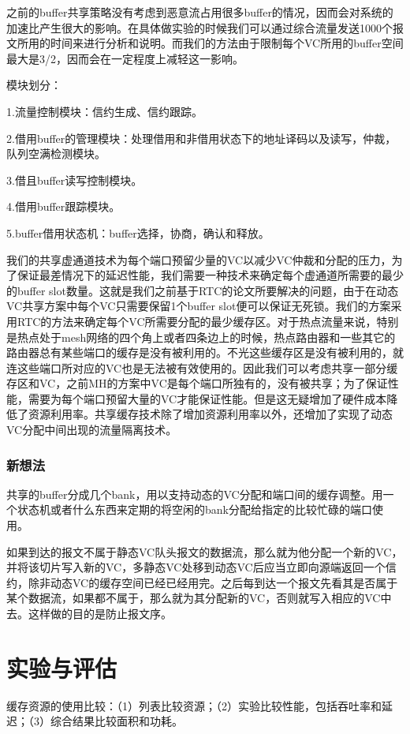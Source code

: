 ﻿\documentclass[10pt,journal]{IEEEtran}
\begin{document}
之前的buffer共享策略没有考虑到恶意流占用很多buffer的情况，因而会对系统的加速比产生很大的影响。在具体做实验的时候我们可以通过综合流量发送1000个报文所用的时间来进行分析和说明。而我们的方法由于限制每个VC所用的buffer空间最大是3/2，因而会在一定程度上减轻这一影响。

模块划分：

1.流量控制模块：信约生成、信约跟踪。

2.借用buffer的管理模块：处理借用和非借用状态下的地址译码以及读写，仲裁，队列空满检测模块。

3.借且buffer读写控制模块。

4.借用buffer跟踪模块。

5.buffer借用状态机：buffer选择，协商，确认和释放。

我们的共享虚通道技术为每个端口预留少量的VC以减少VC仲裁和分配的压力，为了保证最差情况下的延迟性能，我们需要一种技术来确定每个虚通道所需要的最少的buffer slot数量。这就是我们之前基于RTC的论文所要解决的问题，由于在动态VC共享方案中每个VC只需要保留1个buffer slot便可以保证无死锁。我们的方案采用RTC的方法来确定每个VC所需要分配的最少缓存区。对于热点流量来说，特别是热点处于mesh网络的四个角上或者四条边上的时候，热点路由器和一些其它的路由器总有某些端口的缓存是没有被利用的。不光这些缓存区是没有被利用的，就连这些端口所对应的VC也是无法被有效使用的。因此我们可以考虑共享一部分缓存区和VC，之前MH的方案中VC是每个端口所独有的，没有被共享；为了保证性能，需要为每个端口预留大量的VC才能保证性能。但是这无疑增加了硬件成本降低了资源利用率。共享缓存技术除了增加资源利用率以外，还增加了实现了动态VC分配中间出现的流量隔离技术。

\subsubsection{新想法}
共享的buffer分成几个bank，用以支持动态的VC分配和端口间的缓存调整。用一个状态机或者什么东西来定期的将空闲的bank分配给指定的比较忙碌的端口使用。

如果到达的报文不属于静态VC队头报文的数据流，那么就为他分配一个新的VC，并将该切片写入新的VC，多静态VC处移到动态VC后应当立即向源端返回一个信约，除非动态VC的缓存空间已经已经用完。之后每到达一个报文先看其是否属于某个数据流，如果都不属于，那么就为其分配新的VC，否则就写入相应的VC中去。这样做的目的是防止报文序。

\section{实验与评估}
缓存资源的使用比较：（1）列表比较资源；（2）实验比较性能，包括吞吐率和延迟；（3）综合结果比较面积和功耗。
\end{document}
